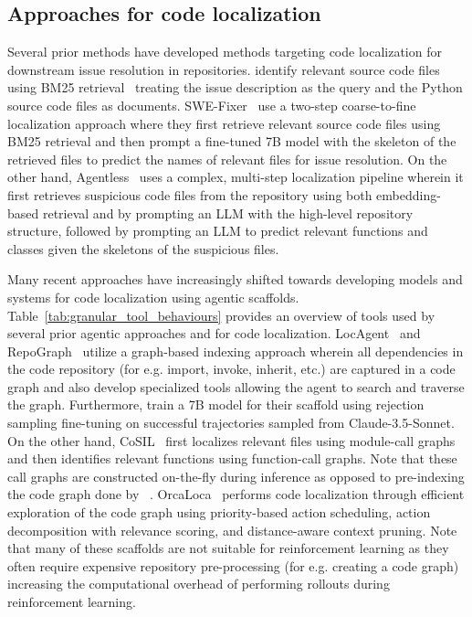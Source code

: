 \subsection{Approaches for code localization}
Several prior methods have developed methods targeting code localization for downstream issue resolution in repositories. \citet{jimenez2024swebenchlanguagemodelsresolve} identify relevant source code files using BM25 retrieval~\citep{article} treating the issue description as the query and the Python source code files as documents. SWE-Fixer~\citep{xie2025swe} use a two-step coarse-to-fine localization approach where they first retrieve relevant source code files using BM25 retrieval and then prompt a fine-tuned 7B model with the skeleton of the retrieved files to predict the names of relevant files for issue resolution. On the other hand, Agentless~\citep{xia2024agentless} uses a complex, multi-step localization pipeline wherein it first retrieves suspicious code files from the repository using both embedding-based retrieval and by prompting an LLM with the high-level repository structure, followed by prompting an LLM to predict relevant functions and classes given the skeletons of the suspicious files. 

Many recent approaches have increasingly shifted towards developing models and systems for code localization using agentic scaffolds. Table~\ref{tab:granular_tool_behaviours} provides an overview of tools used by several prior agentic approaches and \methodname for code localization. LocAgent~\citep{chen-etal-2025-locagent} and RepoGraph~\citep{ouyang2025repographenhancingaisoftware} utilize a graph-based indexing approach wherein all dependencies in the code repository (for e.g. import, invoke, inherit, etc.) are captured in a code graph and also develop specialized tools allowing the agent to search and traverse the graph. Furthermore, \citet{chen-etal-2025-locagent} train a 7B model for their scaffold using rejection sampling fine-tuning on successful trajectories sampled from Claude-3.5-Sonnet. On the other hand, CoSIL~\citep{jiang2025issuelocalizationllmdriveniterative} first localizes relevant files using module-call graphs and then identifies relevant functions using function-call graphs. Note that these call graphs are constructed on-the-fly during inference as opposed to pre-indexing the code graph done by ~\citet{chen-etal-2025-locagent}. OrcaLoca~\citep{yu2025orcalocallmagentframework} performs code localization through efficient exploration of the code graph using priority-based action scheduling, action decomposition with relevance scoring, and distance-aware context pruning. Note that many of these scaffolds are not suitable for reinforcement learning as they often require expensive repository pre-processing (for e.g. creating a code graph) increasing the computational overhead of performing rollouts during reinforcement learning.

